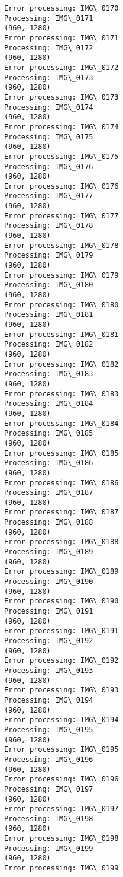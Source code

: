 \documentclass[11pt]{article}
\begin{document}
\begin{Verbatim}[commandchars=\\\{\}]
Error processing: IMG\_0170
Processing: IMG\_0171
(960, 1280)
Error processing: IMG\_0171
Processing: IMG\_0172
(960, 1280)
Error processing: IMG\_0172
Processing: IMG\_0173
(960, 1280)
Error processing: IMG\_0173
Processing: IMG\_0174
(960, 1280)
Error processing: IMG\_0174
Processing: IMG\_0175
(960, 1280)
Error processing: IMG\_0175
Processing: IMG\_0176
(960, 1280)
Error processing: IMG\_0176
Processing: IMG\_0177
(960, 1280)
Error processing: IMG\_0177
Processing: IMG\_0178
(960, 1280)
Error processing: IMG\_0178
Processing: IMG\_0179
(960, 1280)
Error processing: IMG\_0179
Processing: IMG\_0180
(960, 1280)
Error processing: IMG\_0180
Processing: IMG\_0181
(960, 1280)
Error processing: IMG\_0181
Processing: IMG\_0182
(960, 1280)
Error processing: IMG\_0182
Processing: IMG\_0183
(960, 1280)
Error processing: IMG\_0183
Processing: IMG\_0184
(960, 1280)
Error processing: IMG\_0184
Processing: IMG\_0185
(960, 1280)
Error processing: IMG\_0185
Processing: IMG\_0186
(960, 1280)
Error processing: IMG\_0186
Processing: IMG\_0187
(960, 1280)
Error processing: IMG\_0187
Processing: IMG\_0188
(960, 1280)
Error processing: IMG\_0188
Processing: IMG\_0189
(960, 1280)
Error processing: IMG\_0189
Processing: IMG\_0190
(960, 1280)
Error processing: IMG\_0190
Processing: IMG\_0191
(960, 1280)
Error processing: IMG\_0191
Processing: IMG\_0192
(960, 1280)
Error processing: IMG\_0192
Processing: IMG\_0193
(960, 1280)
Error processing: IMG\_0193
Processing: IMG\_0194
(960, 1280)
Error processing: IMG\_0194
Processing: IMG\_0195
(960, 1280)
Error processing: IMG\_0195
Processing: IMG\_0196
(960, 1280)
Error processing: IMG\_0196
Processing: IMG\_0197
(960, 1280)
Error processing: IMG\_0197
Processing: IMG\_0198
(960, 1280)
Error processing: IMG\_0198
Processing: IMG\_0199
(960, 1280)
Error processing: IMG\_0199

    \end{Verbatim}


    
    
    
    
\end{document}
